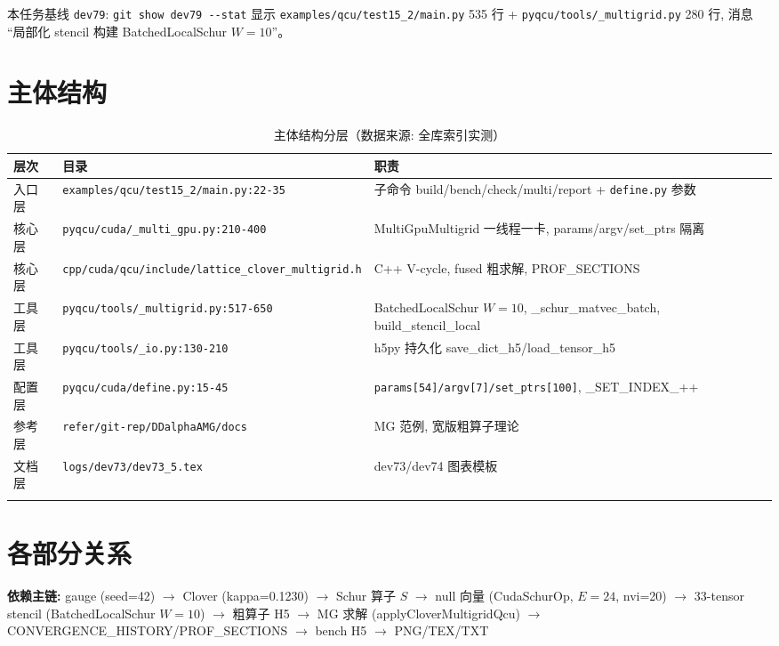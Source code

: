 \documentclass[UTF8]{ctexart}
\begin{document}
\noindent 本任务基线 \texttt{\nolinkurl{dev79}}: \texttt{\nolinkurl{git show dev79 --stat}} 显示 \texttt{\nolinkurl{examples/qcu/test15_2/main.py}} 535 行 + \texttt{\nolinkurl{pyqcu/tools/_multigrid.py}} 280 行, 消息 ``局部化 stencil 构建 BatchedLocalSchur $W=10$''。

\section{主体结构}
\begin{xltabular}{\textwidth}{llX}
\toprule
\textcolor{struct}{层次} & 目录 & \textcolor{struct}{职责} \\
\midrule
\endhead
入口层 & \texttt{\nolinkurl{examples/qcu/test15_2/main.py:22-35}} & 子命令 build/bench/check/multi/report + \texttt{\nolinkurl{define.py}} 参数 \\
核心层 & \texttt{\nolinkurl{pyqcu/cuda/_multi_gpu.py:210-400}} & MultiGpuMultigrid 一线程一卡, params/argv/set\_ptrs 隔离 \\
核心层 & \texttt{\nolinkurl{cpp/cuda/qcu/include/lattice_clover_multigrid.h}} & C++ V-cycle, fused 粗求解, PROF\_SECTIONS \\
工具层 & \texttt{\nolinkurl{pyqcu/tools/_multigrid.py:517-650}} & BatchedLocalSchur $W=10$, \_schur\_matvec\_batch, build\_stencil\_local \\
工具层 & \texttt{\nolinkurl{pyqcu/tools/_io.py:130-210}} & h5py 持久化 save\_dict\_h5/load\_tensor\_h5 \\
配置层 & \texttt{\nolinkurl{pyqcu/cuda/define.py:15-45}} & \texttt{\nolinkurl{params[54]/argv[7]/set_ptrs[100]}}, \_SET\_INDEX\_++ \\
参考层 & \texttt{\nolinkurl{refer/git-rep/DDalphaAMG/docs}} & MG 范例, 宽版粗算子理论 \\
文档层 & \texttt{\nolinkurl{logs/dev73/dev73_5.tex}} & dev73/dev74 图表模板 \\
\bottomrule
\caption{主体结构分层（数据来源: 全库索引实测）}
\end{xltabular}

\section{各部分关系}
\begin{keybox}
\textbf{依赖主链:} \textcolor{relation}{gauge (seed=42) $\to$ Clover (kappa=0.1230) $\to$ Schur 算子 $S$ $\to$ null 向量 (CudaSchurOp, $E=24$, nvi=20) $\to$ 33-tensor stencil (BatchedLocalSchur $W=10$) $\to$ 粗算子 H5 $\to$ MG 求解 (applyCloverMultigridQcu) $\to$ CONVERGENCE\_HISTORY/PROF\_SECTIONS $\to$ bench H5 $\to$ PNG/TEX/TXT}
\end{keybox}
\end{document}
